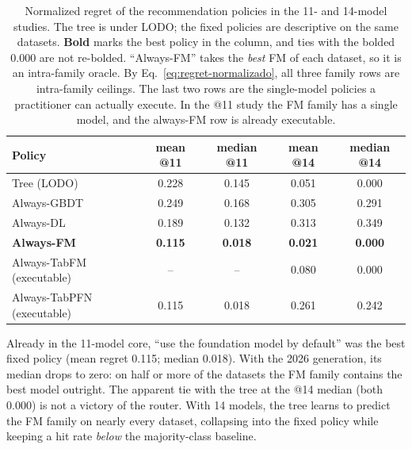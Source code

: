 \begin{table}[htb]
\centering
\caption[Regret of the recommendation policies]{Normalized regret of
the recommendation policies in the 11- and 14-model studies. The tree is under LODO; the fixed policies are descriptive on the same datasets. \textbf{Bold} marks the best policy in the column,
and ties with the bolded 0.000 are not re-bolded. ``Always-FM'' takes
the \emph{best} FM of each dataset, so it is an intra-family oracle.
By Eq.~\ref{eq:regret-normalizado}, all three family rows are
intra-family ceilings. The last two rows are the single-model policies a practitioner can actually execute. In the @11 study
the FM family has a single model, and the always-FM row is already
executable.}
\label{tab:regret-lodo}
\small
\begin{tabular}{lcccc}
\toprule
Policy & mean @11 & median @11 & mean @14 & median @14 \\
\midrule
Tree (LODO)        & 0.228 & 0.145 & 0.051 & 0.000 \\
Always-GBDT        & 0.249 & 0.168 & 0.305 & 0.291 \\
Always-DL          & 0.189 & 0.132 & 0.313 & 0.349 \\
\textbf{Always-FM} & \textbf{0.115} & \textbf{0.018} & \textbf{0.021} &
\textbf{0.000} \\
\midrule
Always-TabFM (executable)  & -- & -- & 0.080 & 0.000 \\
Always-TabPFN (executable) & 0.115 & 0.018 & 0.261 & 0.242 \\
\bottomrule
\end{tabular}
\end{table}

Already in the 11-model core, ``use the foundation model by default''
was the best fixed policy (mean regret 0.115; median 0.018). With the
2026 generation, its median drops to zero: on half or more
of the datasets the FM family contains the best model outright. The apparent tie with the tree at the @14 median (both 0.000) is not a victory of the router. With 14 models, the tree learns to predict the FM family on nearly every dataset, collapsing into the fixed policy while keeping a hit rate \emph{below} the majority-class baseline.

